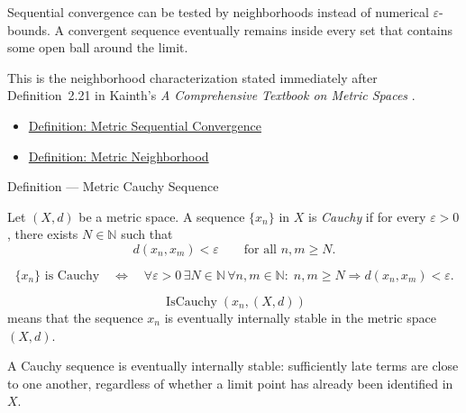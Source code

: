 \begin{remark*}[Interpretation]
Sequential convergence can be tested by neighborhoods instead of numerical
\(\varepsilon\)-bounds.  A convergent sequence eventually remains inside every
set that contains some open ball around the limit.
\end{remark*}

\begin{remark*}
This is the neighborhood characterization stated immediately after
Definition~2.21 in Kainth's \emph{A Comprehensive Textbook on Metric Spaces}
\cite{KainthComprehensiveMetricSpaces2023}.
\end{remark*}

\begin{dependencies}
\begin{itemize}
  \item \hyperref[def:metric-sequential-convergence]{Definition: Metric Sequential Convergence}
  \item \hyperref[def:metric-neighborhood]{Definition: Metric Neighborhood}
\end{itemize}
\end{dependencies}

\begin{definitionbox}{Definition --- Metric Cauchy Sequence}
\begin{definition}
\label{def:metric-cauchy-sequence}
Let \((X,d)\) be a metric space.  A sequence \(\{x_n\}\) in \(X\) is
\emph{Cauchy} if for every \(\varepsilon>0\), there exists \(N\in\mathbb{N}\)
such that
\[
  d(x_n,x_m)<\varepsilon
  \qquad\text{for all } n,m\geq N.
\]
\end{definition}
\end{definitionbox}

\begin{remark*}
\[
\{x_n\}\text{ is Cauchy}
\quad\Longleftrightarrow\quad
\forall\varepsilon>0\,\exists N\in\mathbb{N}\,\forall n,m\in\mathbb{N}{:}\;
n,m\geq N
\Longrightarrow
d(x_n,x_m)<\varepsilon.
\]
\end{remark*}

\begin{remark*}
\[
\operatorname{IsCauchy}(x_n,(X,d))
\]
means that the sequence \(x_n\) is eventually internally stable in the metric
space \((X,d)\).
\end{remark*}

\begin{remark*}[Interpretation]
A Cauchy sequence is eventually internally stable: sufficiently late terms are
close to one another, regardless of whether a limit point has already been
identified in \(X\).
\end{remark*}

